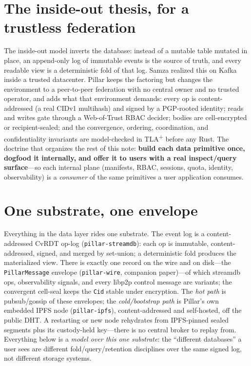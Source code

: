 \documentclass[10pt,twocolumn]{article}
\newcommand{\code}[1]{\texttt{\small #1}}
\newcommand{\Cid}{\code{Cid}}
\begin{document}
\section{The inside-out thesis, for a trustless federation}
The inside-out model inverts the database: instead of a mutable table mutated in
place, an append-only log of immutable events is the source of truth, and every
readable view is a deterministic fold of that log. Samza realized this on Kafka
inside a trusted datacenter. Pillar keeps the factoring but changes the environment
to a peer-to-peer federation with no central owner and no trusted operator, and adds
what that environment demands: every op is content-addressed (a real CIDv1
multihash) and signed by a PGP-rooted identity; reads and writes gate through a
Web-of-Trust RBAC decider; bodies are cell-encrypted or recipient-sealed; and the
convergence, ordering, coordination, and confidentiality invariants are model-checked
in TLA\textsuperscript{+} before any Rust. The doctrine that organizes the rest of
this note: \textbf{build each data primitive once, dogfood it internally, and offer
it to users with a real inspect/query surface}---so each internal plane (manifests,
RBAC, sessions, quota, identity, observability) is a \emph{consumer} of the same
primitives a user application consumes.

\section{One substrate, one envelope}
Everything in the data layer rides one substrate. The event log is a
content-addressed CvRDT op-log (\code{pillar-streamdb}): each op is immutable,
content-addressed, signed, and merged by set-union; a deterministic fold produces the
materialized view. There is exactly one record on the wire and on disk---the
\code{PillarMessage} envelope (\code{pillar-wire}, companion paper)---of which streamdb
ops, observability signals, and every libp2p control message are variants; the
convergent cell-seal keeps the \Cid{} stable under encryption. The \emph{hot path} is
pubsub/gossip of these envelopes; the \emph{cold/bootstrap path} is Pillar's own
embedded IPFS node (\code{pillar-ipfs}), content-addressed and self-hosted, off the
public DHT. A restarting or new node rehydrates from IPFS-pinned sealed segments plus
its custody-held key---there is no central broker to replay from. Everything below is
a \emph{model over this one substrate}: the ``different databases'' a user sees are
different fold/query/retention disciplines over the same signed log, not different
storage systems.
\end{document}
